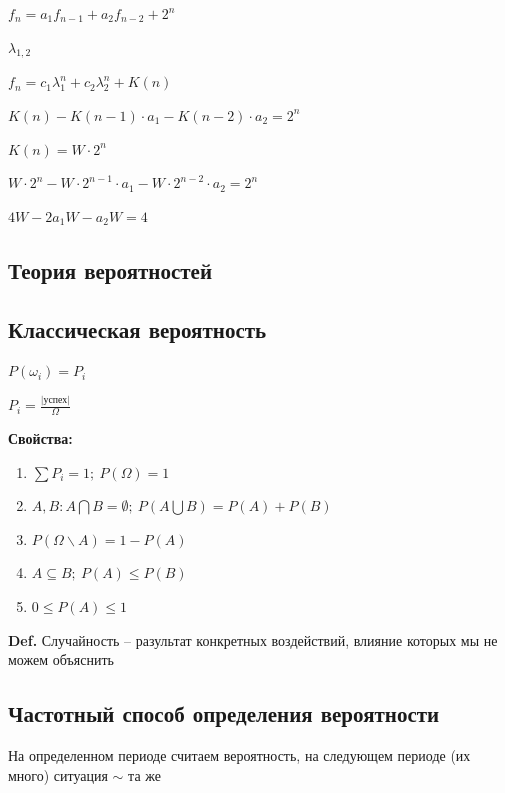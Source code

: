 \documentclass[14pt, letter paper]{article}
\begin{document}
$f_n = a_1f_{n-1} + a_2f_{n-2} + 2^n$

$\lambda_{1,2}$

$f_n = c_1\lambda_1^n + c_2\lambda_2^n + K(n)$

$K(n) - K(n-1) \cdot a_1 - K(n-2) \cdot a_2 = 2^n$

$K(n) = W \cdot 2^n$

$W \cdot 2^n - W \cdot 2^{n-1} \cdot a_1 - W \cdot 2^{n-2} \cdot a_2 = 2^n$

$4W - 2a_1W - a_2W = 4$

\vspace{5mm}

\begin{center}
    \section*{Теория вероятностей}

    \subsection*{Классическая вероятность}
\end{center}

$P(\omega_i) = P_i$

$P_i = \frac{|\text{успех}|}{\Omega}$

\textbf{Свойства:}

\begin{enumerate}
    \item $\sum P_i = 1;\ P(\Omega) = 1$
    \item $A, B : A \bigcap B = \emptyset;\ P(A \bigcup B) = P(A) + P(B)$
    \item $P(\Omega \backslash A) = 1 - P(A)$
    \item $A \subseteq B;\ P(A) \leq P(B)$
    \item $0 \leq P(A) \leq 1$
\end{enumerate}

\textbf{Def.} Случайность -- разультат конкретных воздействий, влияние которых мы не можем объяснить

\begin{center}
    \subsection*{Частотный способ определения вероятности}
\end{center}

На определенном периоде считаем вероятность, на следующем периоде (их много) ситуация $\sim$ та же
\end{document}

